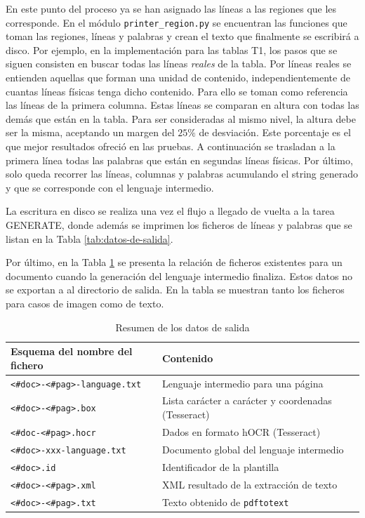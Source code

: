 En este punto del proceso ya se han asignado las líneas a las regiones que les corresponde. En el módulo \verb|printer_region.py| se encuentran las funciones que toman las regiones, líneas y palabras y crean el texto que finalmente se escribirá a disco. Por ejemplo, en la implementación para las tablas T1, los pasos que se siguen consisten en buscar todas las líneas \emph{reales} de la tabla. Por líneas reales se entienden aquellas que forman una unidad de contenido, independientemente de cuantas líneas físicas tenga dicho contenido. Para ello se toman como referencia las líneas de la primera columna. Estas líneas se comparan en altura con todas las demás que están en la tabla. Para ser consideradas al mismo nivel, la altura debe ser la misma, aceptando un margen del $ 25\% $ de desviación. Este porcentaje es el que mejor resultados ofreció en las pruebas. A continuación se trasladan a la primera línea todas las palabras que están en segundas líneas físicas. Por último, solo queda recorrer las líneas, columnas y palabras acumulando el string generado y que se corresponde con el lenguaje intermedio.

La escritura en disco se realiza una vez el flujo a llegado de vuelta a la tarea GENERATE, donde además se imprimen los ficheros de líneas y palabras que se listan en la Tabla \ref{tab:datos-de-salida}.


Por último, en la Tabla \ref{tab:datos-intermedios} se presenta la relación de ficheros existentes para un documento cuando la generación del lenguaje intermedio finaliza. Estos datos no se exportan a al directorio de salida. En la tabla se muestran tanto los ficheros para casos de imagen como de texto.

\begin{table}[ht]
    \centering
    \begin{tabular}{l l}
        Esquema del nombre del fichero & Contenido \\
        \hline
        \hline
        \verb|<#doc>-<#pag>-language.txt| & Lenguaje intermedio para una página \\
        \verb|<#doc>-<#pag>.box| & Lista carácter a carácter y coordenadas (Tesseract) \\
        \verb|<#doc-<#pag>.hocr| & Dados en formato hOCR (Tesseract) \\
        \verb|<#doc>-xxx-language.txt| & Documento global del lenguaje intermedio \\
        \verb|<#doc>.id| & Identificador de la plantilla \\
        \verb|<#doc>-<#pag>.xml| & XML resultado de la extracción de texto \\
        \verb|<#doc>-<#pag>.txt| & Texto obtenido de \verb|pdftotext| \\
    \end{tabular}
    \caption{Resumen de los datos de salida}    
    \label{tab:datos-intermedios}
\end{table}


